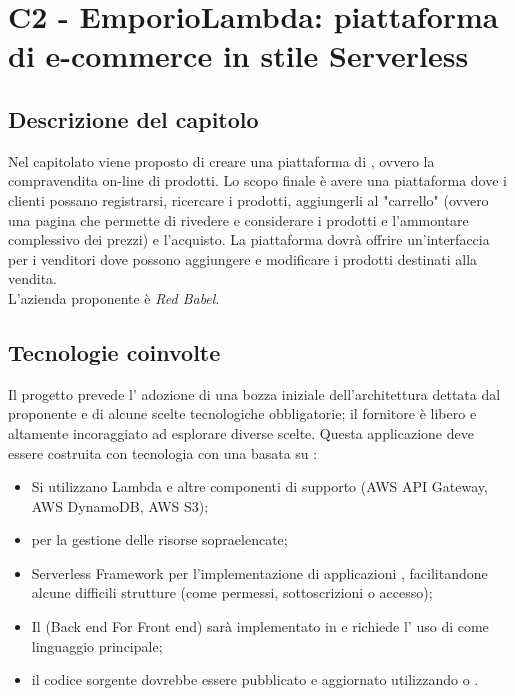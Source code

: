 \section{C2 - EmporioLambda: piattaforma di e-commerce in stile Serverless}

\subsection{Descrizione del capitolo}
Nel capitolato viene proposto di creare una piattaforma di , ovvero la compravendita on-line di prodotti.
Lo scopo finale è avere una piattaforma dove i clienti possano registrarsi, ricercare i prodotti, aggiungerli al "carrello" (ovvero una pagina che permette di rivedere e considerare i prodotti e l'ammontare complessivo dei prezzi) e l'acquisto. La piattaforma dovrà offrire un'interfaccia per i venditori dove possono aggiungere e modificare i prodotti destinati alla vendita.\\
L'azienda proponente è \textit{Red Babel}.

\subsection{Tecnologie coinvolte}
Il progetto prevede l' adozione di una bozza iniziale dell'architettura dettata dal proponente e di alcune scelte tecnologiche obbligatorie; il fornitore è libero e altamente incoraggiato ad esplorare diverse scelte.
Questa applicazione deve essere costruita con tecnologia  con una  basata su :
\begin{itemize}
\item	Si utilizzano  Lambda e altre componenti di supporto (AWS API Gateway, AWS DynamoDB, AWS S3);
\item	{} per la gestione delle risorse sopraelencate;
\item	Serverless Framework per l’implementazione di applicazioni , facilitandone alcune difficili strutture (come permessi, sottoscrizioni o accesso);
\item	Il (Back end For Front end) sarà implementato in  e richiede l' uso di  come linguaggio principale;
\item	il codice sorgente dovrebbe essere pubblicato e aggiornato utilizzando  o .
\end{itemize}

